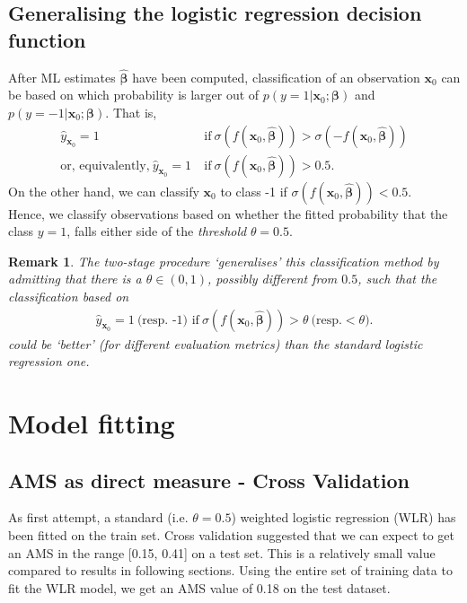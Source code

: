 \documentclass[]{article}
\newcommand{\x}{\mathbf{x}}
\newcommand{\bbeta}{\boldsymbol \beta}
\newtheorem{remark}[theorem]{Remark}
\begin{document}
\subsection{Generalising the logistic regression decision function}
\label{app:decision function}

After ML estimates $\hat{\bbeta}$ have been computed, classification of an observation $\x_0$ can be based on which probability is larger out of $p(y=1|\x_0;\bbeta)$ and $p(y=-1|\x_0;\bbeta)$. That is,
\begin{align*}
\hat{y}_{\x_0}=1 \ &\text{if} \ \sigma(f(\x_0,\hat{\bbeta}))>\sigma(-f(\x_0,\hat{\bbeta})) \\
\text{or, equivalently,} \
\hat{y}_{\x_0}=1  \ &\text{if} \ \sigma(f(\x_0,\hat{\bbeta}))> 0.5.
\end{align*} 
On the other hand, we can classify $\x_0$ to class -1 if $\sigma(f(\x_0,\hat{\bbeta}))< 0.5$. \\

\noindent Hence, we classify observations based on whether the fitted probability that the class $y=1$, falls either side of the \textit{threshold} $\theta = 0.5$.

\begin{remark}
The two-stage procedure `generalises' this classification method by admitting that there is a $\theta\in (0,1)$, possibly different from $0.5$, such that the classification based on 
\begin{align*}
\hat{y}_{\x_0}=1 \ \text{(resp. -1) if}\ \sigma(f(\x_0,\hat{\bbeta}))> \theta \  \text{(resp.} <\theta).
\end{align*}
could be `better' (for different evaluation metrics) than the standard logistic regression one. 
\end{remark}


\section{Model fitting}

\subsection{AMS as direct measure - Cross Validation}

As first attempt, a standard (i.e. $\theta=0.5$) weighted logistic regression (WLR) has been fitted on the train set. Cross validation suggested that we can expect to get an AMS in the range [0.15, 0.41] on a test set. This is a relatively small value compared to results in following sections. Using the entire set of training data to fit the WLR model, we get an AMS value of 0.18 on the test dataset.
\end{document}

